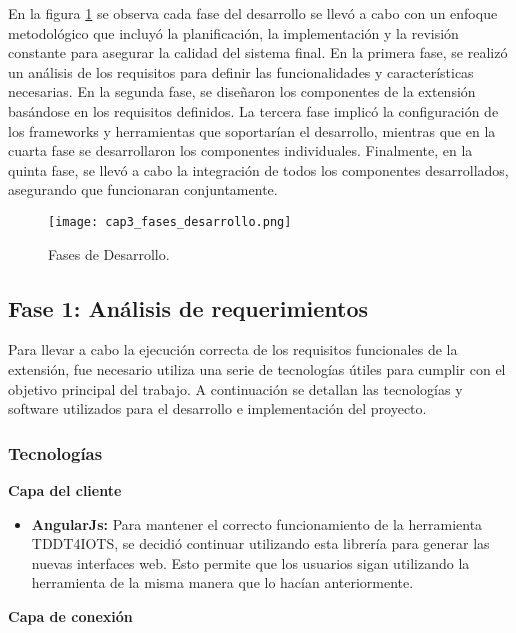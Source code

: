 En la figura \ref{fig:cap3_fases_desarrollo} se observa cada fase del desarrollo se llevó a cabo con un enfoque metodológico que incluyó la planificación, la implementación y la revisión constante para asegurar la calidad del sistema final. En la primera fase, se realizó un análisis de los requisitos para definir las funcionalidades y características necesarias. En la segunda fase, se diseñaron los componentes de la extensión basándose en los requisitos definidos. La tercera fase implicó la configuración de los frameworks y herramientas que soportarían el desarrollo, mientras que en la cuarta fase se desarrollaron los componentes individuales. Finalmente, en la quinta fase, se llevó a cabo la integración de todos los componentes desarrollados, asegurando que funcionaran conjuntamente.

\begin{figure}[H]  
	\centering
	\texttt{[image: cap3\_fases\_desarrollo.png]}
	\caption{Fases de Desarrollo.}
	\label{fig:cap3_fases_desarrollo}
\end{figure}


\subsection{Fase 1: Análisis de requerimientos}

Para llevar a cabo la ejecución correcta de los requisitos funcionales de la extensión, fue necesario utiliza una serie de tecnologías útiles para cumplir con el objetivo principal del trabajo. A continuación se detallan las tecnologías y software utilizados para el desarrollo e implementación del proyecto.

\subsubsection{Tecnologías}

\textbf{Capa del cliente}

\begin{itemize}
	\item \textbf{AngularJs:} Para mantener el correcto funcionamiento de la herramienta TDDT4IOTS, se decidió continuar utilizando esta librería para generar las nuevas interfaces web. Esto permite que los usuarios sigan utilizando la herramienta de la misma manera que lo hacían anteriormente.
\end{itemize}

\textbf{Capa de conexión}

